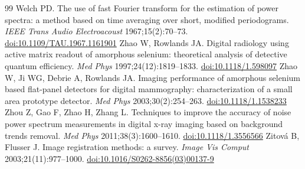\documentclass[11pt,a4paper]{article}
\begin{document}
\begin{thebibliography}{99}
 Welch PD. The use of fast Fourier transform for the estimation of power spectra: a method based on time averaging over short, modified periodograms. \emph{IEEE Trans Audio Electroacoust} 1967;15(2):70--73. \href{https://doi.org/10.1109/TAU.1967.1161901}{doi:10.1109/TAU.1967.1161901}
 Zhao W, Rowlands JA. Digital radiology using active matrix readout of amorphous selenium: theoretical analysis of detective quantum efficiency. \emph{Med Phys} 1997;24(12):1819--1833. \href{https://doi.org/10.1118/1.598097}{doi:10.1118/1.598097}
 Zhao W, Ji WG, Debrie A, Rowlands JA. Imaging performance of amorphous selenium based flat-panel detectors for digital mammography: characterization of a small area prototype detector. \emph{Med Phys} 2003;30(2):254--263. \href{https://doi.org/10.1118/1.1538233}{doi:10.1118/1.1538233}
 Zhou Z, Gao F, Zhao H, Zhang L. Techniques to improve the accuracy of noise power spectrum measurements in digital x-ray imaging based on background trends removal. \emph{Med Phys} 2011;38(3):1600--1610. \href{https://doi.org/10.1118/1.3556566}{doi:10.1118/1.3556566}
 Zitov\'a B, Flusser J. Image registration methods: a survey. \emph{Image Vis Comput} 2003;21(11):977--1000. \href{https://doi.org/10.1016/S0262-8856(03)00137-9}{doi:10.1016/S0262-8856(03)00137-9}
\end{thebibliography}
\end{document}
